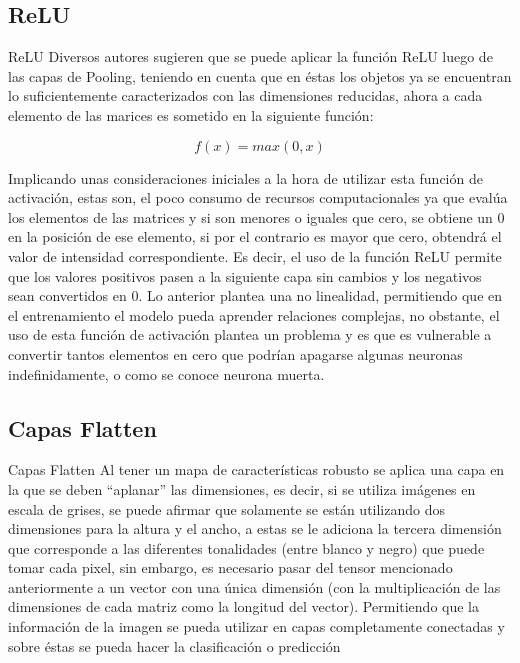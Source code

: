 \documentclass{beamer}
\begin{document}
\subsection{ReLU}
\begin{frame}{ReLU}
    Diversos autores sugieren que se puede aplicar la función ReLU luego de las capas de Pooling, teniendo en cuenta que en éstas los objetos ya se encuentran lo suficientemente caracterizados con las dimensiones reducidas, ahora a cada elemento de las marices es sometido en la siguiente función:
    
    \[
    f(x) = max (0, x)
    \]

    Implicando unas consideraciones iniciales a la hora de utilizar esta función de activación, estas son, el poco consumo de recursos computacionales ya que evalúa los elementos de las matrices y si son menores o iguales que cero, se obtiene un 0 en la posición de ese elemento, si por el contrario es mayor que cero, obtendrá el valor de intensidad correspondiente. Es decir, el uso de la función ReLU permite que los valores positivos pasen a la siguiente capa sin cambios y los negativos sean convertidos en 0. Lo anterior plantea una no linealidad, permitiendo que en el entrenamiento el modelo pueda aprender relaciones complejas, no obstante, el uso de esta función de activación plantea un problema y es que es vulnerable a convertir tantos elementos en cero que podrían apagarse algunas neuronas indefinidamente, o como se conoce neurona muerta.

\end{frame}


\subsection{Capas Flatten}
\begin{frame}{Capas Flatten}
    Al tener un mapa de características robusto se aplica una capa en la que se deben “aplanar” las dimensiones, es decir, si se utiliza imágenes en escala de grises, se puede afirmar que solamente se están utilizando dos dimensiones para la altura y el ancho, a estas se le adiciona la tercera dimensión que corresponde a las diferentes tonalidades (entre blanco y negro) que puede tomar cada pixel, sin embargo, es necesario pasar del tensor mencionado anteriormente a un vector con una única dimensión (con la multiplicación de las dimensiones de cada matriz como la longitud del vector). Permitiendo que la información de la imagen se pueda utilizar en capas completamente conectadas y sobre éstas se pueda hacer la clasificación o predicción
\end{frame}
\end{document}
